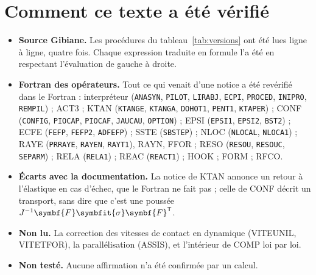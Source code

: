 \documentclass[11pt,a4paper]{article}
\numberwithin{equation}{section}
\newcommand{\pr}[1]{\textsf{#1}}                        %
\newcommand{\op}[1]{\textsf{\small #1}}                 %
\newcommand{\vc}[1]{\symbf{#1}}                         %
\newcommand{\sig}{\symbfit{\sigma}}
\begin{document}
\section{Comment ce texte a été vérifié}

\begin{itemize}
\item \textbf{Source Gibiane.} Les procédures du tableau~\ref{tab:versions} ont été lues ligne à ligne, quatre fois. Chaque expression traduite en formule l'a été en respectant l'évaluation de gauche à droite.
\item \textbf{Fortran des opérateurs.} Tout ce qui venait d'une notice a été revérifié dans le Fortran : interpréteur (\texttt{ANASYN}, \texttt{PILOT}, \texttt{LIRABJ}, \texttt{ECPI}, \texttt{PROCED}, \texttt{INIPRO}, \texttt{REMPIL}) ; \op{ACT3} ; \op{KTAN} (\texttt{KTANGE}, \texttt{KTANGA}, \texttt{DOHOT1}, \texttt{PENT1}, \texttt{KTAPER}) ; \op{CONF} (\texttt{CONFIG}, \texttt{PIOCAP}, \texttt{PIOCAF}, \texttt{JAUCAU}, \texttt{OPTION}) ; \op{EPSI} (\texttt{EPSI1}, \texttt{EPSI2}, \texttt{BST2}) ; \op{ECFE} (\texttt{FEFP}, \texttt{FEFP2}, \texttt{ADFEFP}) ; \op{SSTE} (\texttt{SBSTEP}) ; \op{NLOC} (\texttt{NLOCAL}, \texttt{NLOCA1}) ; \op{RAYE} (\texttt{PRRAYE}, \texttt{RAYEN}, \texttt{RAYT1}), \op{RAYN}, \op{FFOR} ; \op{RESO} (\texttt{RESOU}, \texttt{RESOUC}, \texttt{SEPARM}) ; \op{RELA} (\texttt{RELA1}) ; \op{REAC} (\texttt{REACT1}) ; \op{HOOK} ; \op{FORM} ; \op{RFCO}.
\item \textbf{Écarts avec la documentation.} La notice de \op{KTAN} annonce un retour à l'élastique en cas d'échec, que le Fortran ne fait pas ; celle de \op{CONF} décrit un transport, sans dire que c'est une poussée $J^{-1}\vc F\sig\vc F^{\mathsf T}$.
\item \textbf{Non lu.} La correction des vitesses de contact en dynamique (\pr{VITEUNIL}, \pr{VITETFOR}), la parallélisation (\op{ASSIS}), et l'intérieur de \op{COMP} loi par loi.
\item \textbf{Non testé.} Aucune affirmation n'a été confirmée par un calcul.
\end{itemize}
\end{document}
